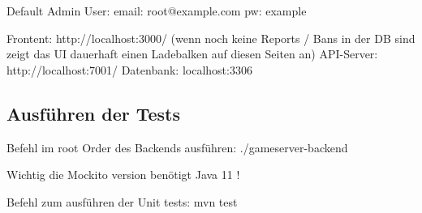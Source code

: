 Default Admin User: email: root@example.com pw: example




Frontent: http://localhost:3000/
(wenn noch keine Reports / Bans in der DB sind zeigt das UI dauerhaft einen Ladebalken auf diesen Seiten an)
\newline
API-Server: http://localhost:7001/
\newline
Datenbank: localhost:3306



\subsection{Ausführen der Tests}

Befehl im root Order des Backends ausführen: ./gameserver-backend

Wichtig die Mockito version benötigt Java 11 !

Befehl zum ausführen der Unit tests: mvn test